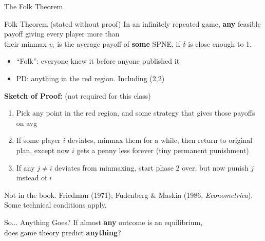 \begin{frame}{The Folk Theorem}
\begin{block}{Folk Theorem (stated without proof)}
In an infinitely repeated game, \textbf{any} feasible payoff giving every player more than\\ their minmax $v_i$ is the average payoff of \textbf{some} SPNE, if $\delta$ is close enough to 1.
\end{block}
\bsk
\begin{itemize}
    \item ``Folk'': everyone knew it before anyone published it
    \item PD: anything in the red region. Including (2,2)
\end{itemize}
\bsk
\textbf{Sketch of Proof:} (not required for this class)
\begin{enumerate}
    \item Pick any point in the red region, and some strategy that gives those payoffs on avg
    \item If some player $i$ deviates, minmax them for a while, then return to original plan, except now $i$ gets a penny less forever (tiny permanent punishment)
    \item If any $j\neq i$ deviates from minmaxing, start phase 2 over, but now punish $j$ instead of $i$
\end{enumerate}
{\footnotesize Not in the book. Friedman (1971); Fudenberg \& Maskin (1986, \textit{Econometrica}). Some technical conditions apply.}
\vspace{-0.2in}
\end{frame}

\begin{frame}{So... Anything Goes?}
\centering
\vspace{0.3in}
{\Large If almost \textbf{any} outcome is an equilibrium,\\[6pt] does game theory predict \textbf{anything}?}
\vspace{0.5in}

\raggedright
{}
\vspace{-0.3in}
\end{frame}

